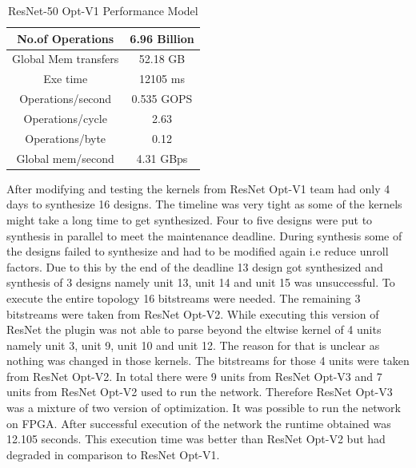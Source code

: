 \begin{table}[!htb]
\centering
\captionsetup{
justification = centering
}
\caption{ResNet-50 Opt-V1 Performance Model}
\label{tab:ResNet50OptV3PerformanceModel}
\begin{tabular}{|c|c|}
\hline
No.of Operations     & 6.96 Billion \\ \hline
Global Mem transfers & 52.18 GB     \\ \hline
Exe time             & 12105 ms     \\ \hline
Operations/second    & 0.535 GOPS   \\ \hline
Operations/cycle     & 2.63         \\ \hline
Operations/byte      & 0.12         \\ \hline
Global mem/second    & 4.31 GBps    \\ \hline
\end{tabular}
\end{table}
After modifying and testing the kernels from ResNet Opt-V1 team had only 4 days to synthesize 16 designs. The timeline was very tight as some of the kernels might take a long time to get synthesized. Four to five designs were put to synthesis in parallel to meet the maintenance deadline. During synthesis some of the designs failed to synthesize and had to be modified again i.e reduce unroll factors. Due to this by the end of the deadline 13 design got synthesized and synthesis of 3 designs namely unit 13, unit 14 and unit 15 was unsuccessful. 
\newline
To execute the entire topology 16 bitstreams were needed. The remaining 3 bitstreams were taken from ResNet Opt-V2. While executing this version of ResNet the plugin was not able to parse beyond the eltwise kernel of 4 units namely unit 3, unit 9, unit 10 and unit 12. The reason for that is unclear as nothing was changed in those kernels. The bitstreams for those 4 units were taken from ResNet Opt-V2. In total there were 9 units from ResNet Opt-V3 and 7 units from ResNet Opt-V2 used to run the network. Therefore ResNet Opt-V3 was a mixture of two version of optimization. 
\newline
It was possible to run the network on FPGA. After successful execution of the network the runtime obtained was 12.105 seconds. This execution time was better than ResNet Opt-V2 but had degraded in comparison to ResNet Opt-V1. 
